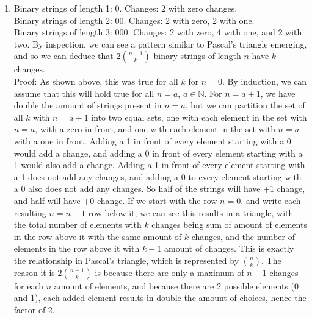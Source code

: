 \documentclass[10pt,english]{article}
\begin{document}
\begin{enumerate}
\item Binary strings of length 1: 0. Changes: 2 with zero changes.\\ Binary strings of length 2: 00. Changes: 2 with zero, 2 with one.\\Binary strings of length 3: 000. Changes: 2 with zero, 4 with one, and 2 with two. By inspection, we can see a pattern similar to Pascal's triangle emerging, and so we can deduce that $2{n-1\choose k}$ binary strings of length $n$ have $k$ changes. \\
Proof: As shown above, this was true for all $k$ for $n=0$. By induction, we can assume that this will hold true for all $n=a$, $a\in\mathbb{N}$. For $n=a+1$, we have double the amount of strings present in $n=a$, but we can partition the set of all $k$ with $n=a+1$ into two equal sets, one with each element in the set with $n=a$, with a zero in front, and one with each element in the set with $n=a$ with a one in front. Adding a 1 in front of every element starting with a 0 would add a change, and adding a 0 in front of every element starting with a 1 would also add a change. Adding a 1 in front of every element starting with a 1 does not add any changes, and adding a 0 to every element starting with a 0 also does not add any changes. So half of the strings will have +1 change, and half will have +0 change. If we start with the row $n=0$, and write each resulting $n=n+1$ row below it, we can see this results in a triangle, with the total number of elements with $k$ changes being sum of amount of elements in the row above it with the same amount of $k$ changes, and the number of elements in the row above it with $k-1$ amount of changes. This is exactly the relationship in Pascal's triangle, which is represented by ${n\choose k}$. The reason it is $2{n-1\choose k}$ is because there are only a maximum of $n-1$ changes for each $n$ amount of elements, and because there are 2 possible elements (0 and 1), each added element results in double the amount of choices, hence the factor of 2. 

\pagebreak



\end{enumerate}
\end{document}
